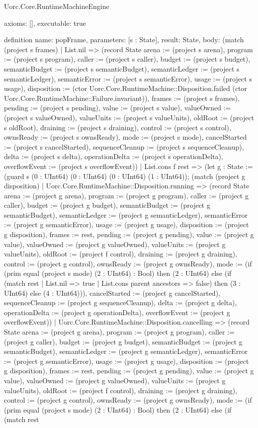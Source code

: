 \begin{lexlean}{Uorc.Core.RuntimeMachineEngine}
\begin{semanticmodule}
{  axioms: [],
  executable: true
}

definition{
  name: popFrame,
  parameters: [s : State],
  result: State,
  body: (match (project s frames)
    | List.nil => (record State {arena := (project s arena), program := (project s program), caller := (project s caller), budget := (project s budget), semanticBudget := (project s semanticBudget), semanticLedger := (project s semanticLedger), semanticError := (project s semanticError), usage := (project s usage), disposition := (ctor Uorc.Core.RuntimeMachine::Disposition.failed (ctor Uorc.Core.RuntimeMachine::Failure.invariant)), frames := (project s frames), pending := (project s pending), value := (project s value), valueOwned := (project s valueOwned), valueUnits := (project s valueUnits), oldRoot := (project s oldRoot), draining := (project s draining), control := (project s control), ownsReady := (project s ownsReady), mode := (project s mode), cancelStarted := (project s cancelStarted), sequenceCleanup := (project s sequenceCleanup), delta := (project s delta), operationDelta := (project s operationDelta), overflowEvent := (project s overflowEvent)})
    | List.cons f rest => (let g : State := (guard s (0 : UInt64) (0 : UInt64) (0 : UInt64) (1 : UInt64)); (match (project g disposition)
      | Uorc.Core.RuntimeMachine::Disposition.running => (record State {arena := (project g arena), program := (project g program), caller := (project g caller), budget := (project g budget), semanticBudget := (project g semanticBudget), semanticLedger := (project g semanticLedger), semanticError := (project g semanticError), usage := (project g usage), disposition := (project g disposition), frames := rest, pending := (project g pending), value := (project g value), valueOwned := (project g valueOwned), valueUnits := (project g valueUnits), oldRoot := (project f control), draining := (project g draining), control := (project g control), ownsReady := (project g ownsReady), mode := (if (prim equal (project s mode) (2 : UInt64) : Bool) then (2 : UInt64) else (if (match rest
        | List.nil => true
        | List.cons parent ancestors => false) then (3 : UInt64) else (4 : UInt64))), cancelStarted := (project g cancelStarted), sequenceCleanup := (project g sequenceCleanup), delta := (project g delta), operationDelta := (project g operationDelta), overflowEvent := (project g overflowEvent)})
      | Uorc.Core.RuntimeMachine::Disposition.cancelling => (record State {arena := (project g arena), program := (project g program), caller := (project g caller), budget := (project g budget), semanticBudget := (project g semanticBudget), semanticLedger := (project g semanticLedger), semanticError := (project g semanticError), usage := (project g usage), disposition := (project g disposition), frames := rest, pending := (project g pending), value := (project g value), valueOwned := (project g valueOwned), valueUnits := (project g valueUnits), oldRoot := (project f control), draining := (project g draining), control := (project g control), ownsReady := (project g ownsReady), mode := (if (prim equal (project s mode) (2 : UInt64) : Bool) then (2 : UInt64) else (if (match rest
}}
\end{semanticmodule}
\end{lexlean}
